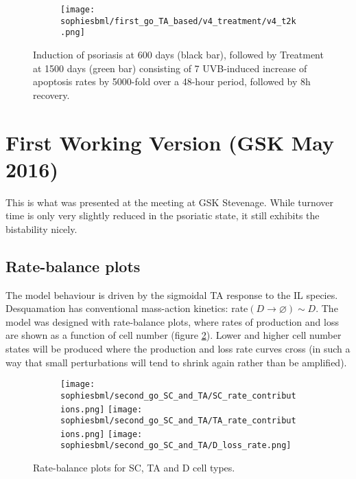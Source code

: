 \documentclass[a4paper,10pt]{report}
\newcommand{\psortbase}{/home/ngrs2/work/bsu/PSORT_Zuliani_Reynolds/}
\newcommand{\sbmlbase}{\psortbase/sbml-sh/}
\newcommand{\sophiesbml}{\sbmlbase/sophie_like}
\begin{document}
\begin{figure}[h!]
  \begin{subfigure}{\textwidth}
    \texttt{[image: \\sophiesbml/first\_go\_TA\_based/v4\_treatment/v4\_t2k.png]}
  \end{subfigure}
  \caption{Induction of psoriasis at 600 days (black bar), followed by Treatment at 1500 days (green bar) consisting of  7 UVB-induced increase of apoptosis rates by 5000-fold over a 48-hour period, followed by 8h recovery.}
  \label{fig:firstsophie_treatment}
\end{figure}


\section{First Working Version (GSK May 2016)}\label{sec:SWmay16}



This is what was presented at the meeting at GSK Stevenage. 
While turnover time is only very slightly reduced in the psoriatic state,
it still exhibits the bistability nicely. 

\subsection{Rate-balance plots}

The model behaviour is driven by the sigmoidal TA response to the IL species. 
Desquamation has conventional mass-action kinetics: rate$(D\rightarrow\varnothing) \sim D$. The model was designed with rate-balance plots, where rates of production and loss are shown as a function of cell number (figure \ref{fig:secondratebalance}). Lower and higher cell
number states will be produced where the production and loss rate curves cross
(in such a way that small perturbations will tend to shrink again 
rather than be amplified). 

\begin{figure}[h!]
  \begin{subfigure}{\textwidth}
    \texttt{[image: \\sophiesbml/second\_go\_SC\_and\_TA/SC\_rate\_contributions.png]}
    \texttt{[image: \\sophiesbml/second\_go\_SC\_and\_TA/TA\_rate\_contributions.png]}
    \texttt{[image: \\sophiesbml/second\_go\_SC\_and\_TA/D\_loss\_rate.png]}
  \end{subfigure}
  \caption{Rate-balance plots for SC, TA and D cell types.}
  \label{fig:secondratebalance}
\end{figure}
\end{document}
